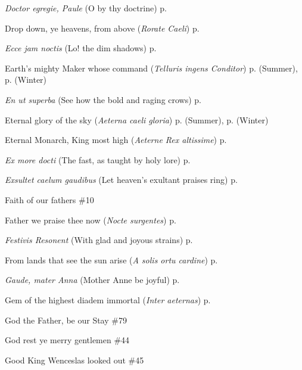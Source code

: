 \begin{hangparas}{1.25em}{1}
\par\noindent
\textit{Doctor egregie, Paule} (O by thy doctrine) \dotfill p. \pageref{PaulEvensong}
\par\noindent
Drop down, ye heavens, from above (\textit{Rorate Caeli}) \dotfill p. \pageref{AdventProse}
\par\noindent
\textit{Ecce jam noctis} (Lo! the dim shadows) \dotfill p. \pageref{SundayMattinsSummer}
\par\noindent
Earth's mighty Maker whose command (\textit{Telluris ingens Conditor}) \dotfill p. \pageref{TuesdayEvensongSummer} (Summer), p. \pageref{TuesdayEvensongWinter} (Winter)
\par\noindent
\textit{En ut superba} (See how the bold and raging crows) \dotfill p. \pageref{CompassionInvitatory}
\par\noindent
Eternal glory of the sky (\textit{Aeterna caeli gloria}) \dotfill p. \pageref{FridayMattinsSummer} (Summer), p. \pageref{FridayMattinsWinter} (Winter)
\par\noindent
Eternal Monarch, King most high (\textit{Aeterne Rex altissime}) \dotfill p. \pageref{AscensionInvitatory}
\par\noindent
\textit{Ex more docti} (The fast, as taught by holy lore) \dotfill p. \pageref{FirstLentInvitatory}
\par\noindent
\textit{Exsultet caelum gaudibus} (Let heaven's exultant praises ring) \dotfill p. \pageref{JohnMattins}
\par\noindent
Faith of our fathers \dotfill \#10
\par\noindent
Father we praise thee now (\textit{Nocte surgentes}) \dotfill p. \pageref{SundayInvitatorySummer}
\par\noindent
\textit{Festivis Resonent} (With glad and joyous strains) \dotfill p. \pageref{PreciousBloodEvensong}
\par\noindent
From lands that see the sun arise (\textit{A solis ortu cardine}) \dotfill p. \pageref{ChristmasMattins}
\par\noindent
\textit{Gaude, mater Anna} (Mother Anne be joyful) \dotfill p. \pageref{AnneEvensong}
\par\noindent
Gem of the highest diadem immortal (\textit{Inter aeternas}) \dotfill p. \pageref{BenedictMattins}
\par\noindent
God the Father, be our Stay \dotfill \#79
\par\noindent
God rest ye merry gentlemen \dotfill \#44
\par\noindent
Good King Wenceslas looked out \dotfill \#45

\end{hangparas}
